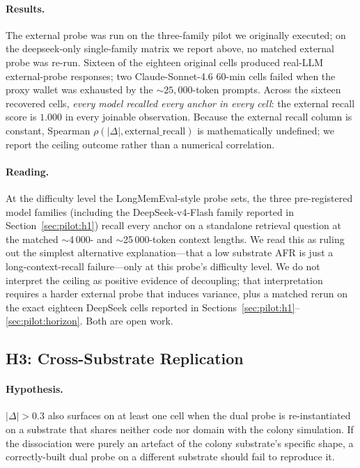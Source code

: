 \paragraph{Results.}
The external probe was run on the three-family pilot we
originally executed; on the deepseek-only single-family matrix we
report above, no matched external probe was re-run. Sixteen of
the eighteen original cells produced real-LLM external-probe
responses; two Claude-Sonnet-4.6 60-min cells failed when the
proxy wallet was exhausted by the ${\sim}25{,}000$-token prompts.
Across the sixteen recovered cells, \emph{every model recalled
every anchor in every cell}: the external recall score is $1.000$
in every joinable observation. Because the external recall column
is constant, Spearman $\rho(|\Delta|,
\mathrm{external\_recall})$ is mathematically undefined; we
report the ceiling outcome rather than a numerical correlation.

\paragraph{Reading.}
At the difficulty level the LongMemEval-style probe sets, the
three pre-registered model families (including the DeepSeek-v4-Flash
family reported in Section~\ref{sec:pilot:h1}) recall every
anchor on a standalone retrieval question at the matched
$\sim$4\,000- and $\sim$25\,000-token context lengths. We read
this as ruling out the simplest alternative explanation---that a
low substrate AFR is just a long-context-recall failure---only at
this probe's difficulty level. We do not interpret the ceiling as
positive evidence of decoupling; that interpretation requires a
harder external probe that induces variance, plus a matched rerun
on the exact eighteen DeepSeek cells reported in
Sections~\ref{sec:pilot:h1}--\ref{sec:pilot:horizon}. Both are
open work.

\subsection{H3: Cross-Substrate Replication}
\label{sec:pilot:h3}

\paragraph{Hypothesis.}
$|\Delta| > 0.3$ also surfaces on at least one cell when the dual
probe is re-instantiated on a substrate that shares neither code
nor domain with the colony simulation. If the dissociation were
purely an artefact of the colony substrate's specific shape, a
correctly-built dual probe on a different substrate should fail
to reproduce it.

